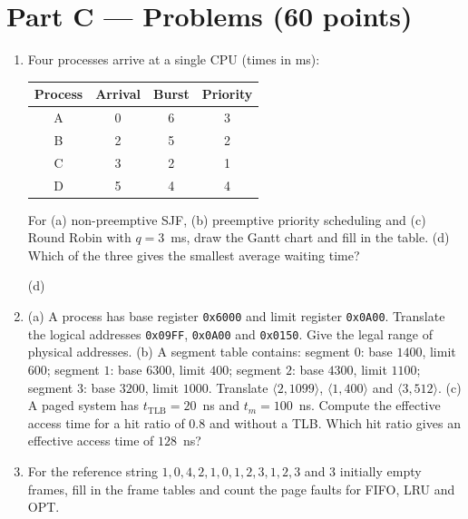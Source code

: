 \section*{Part C --- Problems \hfill (60 points)}
\begin{enumerate}[leftmargin=2.0em,label=C\arabic*.,itemsep=0.5em]
  \item {} Four processes arrive at a single CPU (times in ms):
  \begin{center}
  \begin{tabular}{@{}cccc@{}}
  \toprule
  \textbf{Process} & \textbf{Arrival} & \textbf{Burst} & \textbf{Priority} \\
  \midrule
  A & 0 & 6 & 3 \\ B & 2 & 5 & 2 \\ C & 3 & 2 & 1 \\ D & 5 & 4 & 4 \\
  \bottomrule
  \end{tabular}
  \end{center}
  For (a) non-preemptive SJF, (b) preemptive priority scheduling and (c) Round Robin with $q = 3$~ms, draw the Gantt chart and fill in the table. (d) Which of the three gives the smallest average waiting time?

  \proctable
  \proctable
  \proctable
  \par\medskip (d) \hrulefill

  \newpage
  \item {}
  (a) A process has base register \texttt{0x6000} and limit register \texttt{0x0A00}. Translate the logical addresses \texttt{0x09FF}, \texttt{0x0A00} and \texttt{0x0150}. Give the legal range of physical addresses. 
  \ans{2.6cm}
  (b) A segment table contains: segment $0$: base $1400$, limit $600$; segment $1$: base $6300$, limit $400$; segment $2$: base $4300$, limit $1100$; segment $3$: base $3200$, limit $1000$. Translate $\langle 2, 1099\rangle$, $\langle 1, 400\rangle$ and $\langle 3, 512\rangle$. 
  \ans{2.4cm}
  (c) A paged system has $t_{\text{TLB}} = 20$~ns and $t_m = 100$~ns. Compute the effective access time for a hit ratio of $0.8$ and without a TLB. Which hit ratio gives an effective access time of $128$~ns? 
  \ans{2.6cm}

  \item {} For the reference string $1, 0, 4, 2, 1, 0, 1, 2, 3, 1, 2, 3$ and $3$ initially empty frames, fill in the frame tables and count the page faults for FIFO, LRU and OPT.
  \par\medskip
  \par\medskip
  \par\medskip


\end{enumerate}
